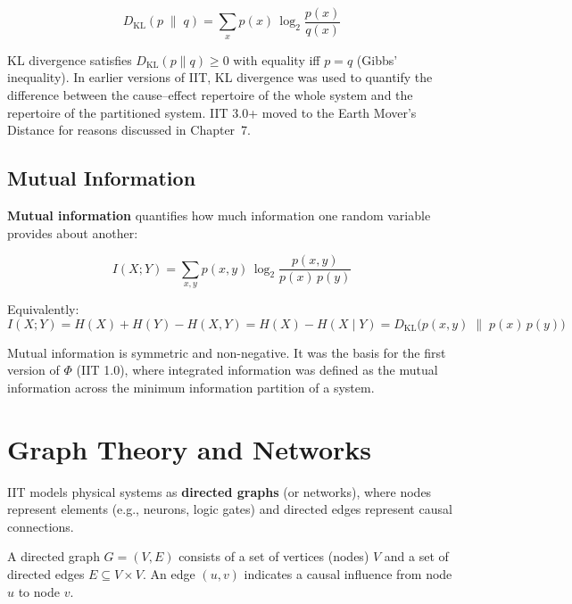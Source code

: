 \documentclass[11pt,a4paper]{report}
\newcommand{\Phi}{\varPhi}
\begin{document}
\begin{mathbox}
\vspace{-8pt}
\[
  D_{\mathrm{KL}}(p \;\|\; q) = \sum_{x} p(x)\, \log_2 \frac{p(x)}{q(x)}
\]
\vspace{-10pt}
\end{mathbox}

KL divergence satisfies $D_{\mathrm{KL}}(p \| q) \geq 0$ with equality iff $p = q$ (Gibbs' inequality). In earlier versions of IIT, KL divergence was used to quantify the difference between the cause--effect repertoire of the whole system and the repertoire of the partitioned system. IIT 3.0+ moved to the Earth Mover's Distance for reasons discussed in Chapter~7.

\subsection{Mutual Information}

\textbf{Mutual information} quantifies how much information one random variable provides about another:

\begin{mathbox}
\vspace{-8pt}
\[
  I(X; Y) = \sum_{x, y} p(x, y)\, \log_2 \frac{p(x, y)}{p(x)\, p(y)}
\]
\vspace{-10pt}
\end{mathbox}

Equivalently:
\[
  I(X; Y) = H(X) + H(Y) - H(X, Y) = H(X) - H(X \mid Y) = D_{\mathrm{KL}}\bigl(p(x,y) \;\|\; p(x)\,p(y)\bigr)
\]

Mutual information is symmetric and non-negative. It was the basis for the first version of $\Phi$ (IIT 1.0), where integrated information was defined as the mutual information across the minimum information partition of a system.

\section{Graph Theory and Networks}

IIT models physical systems as \textbf{directed graphs} (or networks), where nodes represent elements (e.g., neurons, logic gates) and directed edges represent causal connections.

\begin{definitionbox}
A directed graph $G = (V, E)$ consists of a set of vertices (nodes) $V$ and a set of directed edges $E \subseteq V \times V$. An edge $(u, v)$ indicates a causal influence from node $u$ to node $v$.
\end{definitionbox}
\end{document}
